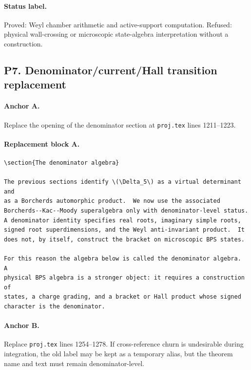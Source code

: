 \paragraph{Status label.}
Proved: Weyl chamber arithmetic and active-support computation.  Refused:
physical wall-crossing or microscopic state-algebra interpretation without
a construction.

\subsection{P7. Denominator/current/Hall transition replacement}

\paragraph{Anchor A.}
Replace the opening of the denominator section at
\texttt{proj.tex} lines 1211--1223.

\paragraph{Replacement block A.}
\begin{verbatim}
\section{The denominator algebra}

The previous sections identify \(\Delta_5\) as a virtual determinant and
as a Borcherds automorphic product.  We now use the associated
Borcherds--Kac--Moody superalgebra only with denominator-level status.
A denominator identity specifies real roots, imaginary simple roots,
signed root superdimensions, and the Weyl anti-invariant product.  It
does not, by itself, construct the bracket on microscopic BPS states.

For this reason the algebra below is called the denominator algebra.  A
physical BPS algebra is a stronger object: it requires a construction of
states, a charge grading, and a bracket or Hall product whose signed
character is the denominator.
\end{verbatim}

\paragraph{Anchor B.}
Replace \texttt{proj.tex} lines 1254--1278.  If cross-reference churn is
undesirable during integration, the old label may be kept as a temporary
alias, but the theorem name and text must remain denominator-level.

